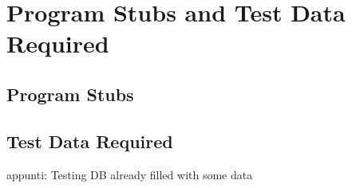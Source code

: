 \newpage
\section{Program Stubs and Test Data Required}
\subsection{Program Stubs}


\subsection{Test Data Required}
appunti: Testing DB already filled with some data
